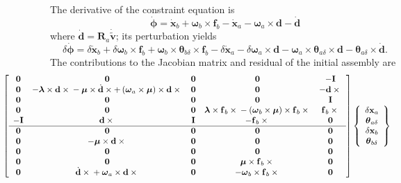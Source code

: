 \documentclass[10pt,dvips,fleqn,subeqn]{report}
\newcommand{\T}[1]{\bm{\mathbf{#1}}}
\begin{document}
The derivative of the constraint equation is
\begin{equation}
	\dot{\T{\phi}} = 
		\dot{\T{x}}_b
		+ \T{\omega}_b \times \T{f}_b
		- \dot{\T{x}}_a
		- \T{\omega}_a \times \T{d}
		- \dot{\T{d}}
\end{equation}
where $\dot{\T{d}}=\T{R}_a\dot{\tilde{\T{v}}}$; its perturbation yields
\begin{equation}
	\delta\dot{\T{\phi}}
	= \delta\dot{\T{x}}_b
	+ \delta\T{\omega}_b \times \T{f}_b
	+ \T{\omega}_b \times \T{\theta}_{b\delta} \times \T{f}_b
	- \delta\dot{\T{x}}_a
	- \delta\T{\omega}_a \times \T{d}
	- \T{\omega}_a \times \T{\theta}_{a\delta} \times \T{d}
	- \T{\theta}_{a\delta} \times \dot{\T{d}} .
\end{equation}
The contributions to the Jacobian matrix and residual 
of the initial assembly are
\begin{align}
	\small
	& \hspace{-20mm}\sqbr{\matr{ccccc}{
		\T{0} & \T{0} & \T{0} & \T{0} & -\T{I} \\	%
		\T{0} & -\T{\lambda}\times\T{d}\times{}
			- \T{\mu}\times\dot{\T{d}}\times
			+ \plbr{\T{\omega}_a\times\T{\mu}}\times\T{d}\times{} &
			\T{0} & \T{0} & -\T{d}\times{} \\	%
		\T{0} & \T{0} & \T{0} & \T{0} & \T{I} \\	%
		\T{0} & \T{0} & \T{0} & 
			\T{\lambda}\times\T{f}_b\times{}
			- \plbr{\T{\omega}_b\times\T{\mu}}\times\T{f}_b\times{} &
			\T{f}_b\times{} \\	%
		-\T{I} & \T{d}\times{} & \T{I} & -\T{f}_b\times{} &
			\T{0} \\				%
%
	\hline
		\T{0} & \T{0} & \T{0} & \T{0} & \T{0} \\	%
		\T{0} & -\T{\mu}\times\T{d}\times{} &
			\T{0} & \T{0} & \T{0} \\		%
		\T{0} & \T{0} & \T{0} & \T{0} & \T{0} \\	%
		\T{0} & \T{0} & \T{0} &
			\T{\mu}\times\T{f}_b\times{} & \T{0} \\	%
		\T{0} &
			\dot{\T{d}}\times{}
			+ \T{\omega}_a\times\T{d}\times{} &
			\T{0} &
			-\T{\omega}_b\times\T{f}_b\times{} &
			\T{0}					%
	}} \cubr{\cvvect{
		\delta\T{x}_a \\
		\T{\theta}_{a\delta} \\
		\delta\T{x}_b \\
		\T{\theta}_{b\delta} \\
}}
\end{align}
\end{document}
